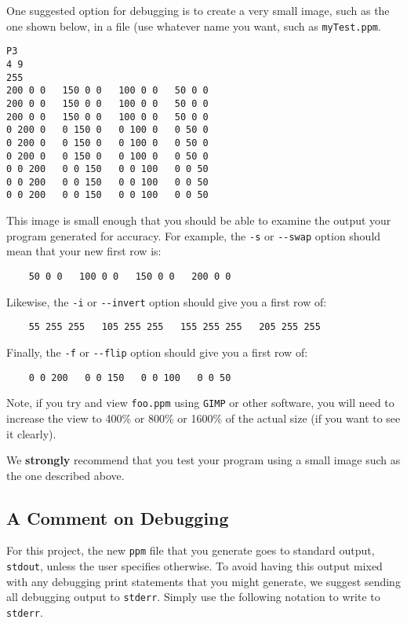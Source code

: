 \documentclass[12pt]{article}
\begin{document}
One suggested option for debugging is to create a very small image, such
as the one shown below, in a file (use whatever name you want, such as
{\tt myTest.ppm}.

\begin{verbatim}
P3
4 9
255
200 0 0   150 0 0   100 0 0   50 0 0
200 0 0   150 0 0   100 0 0   50 0 0
200 0 0   150 0 0   100 0 0   50 0 0
0 200 0   0 150 0   0 100 0   0 50 0
0 200 0   0 150 0   0 100 0   0 50 0
0 200 0   0 150 0   0 100 0   0 50 0
0 0 200   0 0 150   0 0 100   0 0 50
0 0 200   0 0 150   0 0 100   0 0 50
0 0 200   0 0 150   0 0 100   0 0 50
\end{verbatim}

This image is small enough that you should be able to examine the output
your program generated for accuracy.  For example, the {\tt -s} or {\tt -{}-swap}
option should mean that your new first row is:

\begin{verbatim}
    50 0 0   100 0 0   150 0 0   200 0 0
\end{verbatim}

Likewise, the {\tt -i} or {\tt -{}-invert} option should give you a first row of:

\begin{verbatim}
    55 255 255   105 255 255   155 255 255   205 255 255
\end{verbatim}

Finally, the {\tt -f} or {\tt -{}-flip} option should give you a first row of:

\begin{verbatim}
    0 0 200   0 0 150   0 0 100   0 0 50
\end{verbatim}

Note, if you try and view {\tt foo.ppm} using {\tt GIMP} or other software,
you will need to increase the view to 400\% or 800\% or 1600\% of the actual size
(if you want to see it clearly).

We {\bf strongly} recommend that you test your program using a small image
such as the one described above.

\subsection*{A Comment on Debugging}

For this project, the new {\tt ppm} file that you generate goes to standard output,
{\tt stdout}, unless the user specifies otherwise.  To avoid having this output
mixed with any debugging print statements that you might generate, we suggest
sending all debugging output to {\tt stderr}.  Simply use the following
notation to write to {\tt stderr}.
\end{document}
